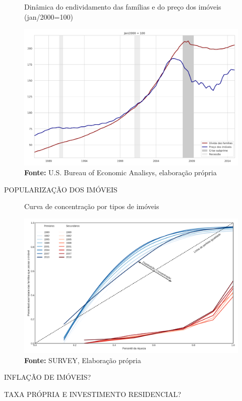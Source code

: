 \begin{figure}[htb]
	\centering
	\caption{Dinâmica do endividamento das famílias e do preço dos imóveis (jan/2000=100)}
	\label{FigDividaPreco}
	\includegraphics[width=\textwidth]{../../Dados/Fatos_Estilizados/figs/Divida_PrecoImoveis.png}
	\caption*{\textbf{Fonte:} U.S. Bureau of Economic Analisys, elaboração própria}
\end{figure}


POPULARIZAÇÃO DOS IMÓVEIS

\begin{figure}[htb]
	\centering
	\caption{Curva de concentração por tipos de imóveis}
	\label{FigConcentracao}
	\includegraphics[width=\textwidth]{../../Dados/Fatos_Estilizados/figs/Concentracao_Imoveis.png}
	\caption*{\textbf{Fonte:} SURVEY, Elaboração própria}
\end{figure}

INFLAÇÃO DE IMÓVEIS?

TAXA PRÓPRIA E INVESTIMENTO RESIDENCIAL?



